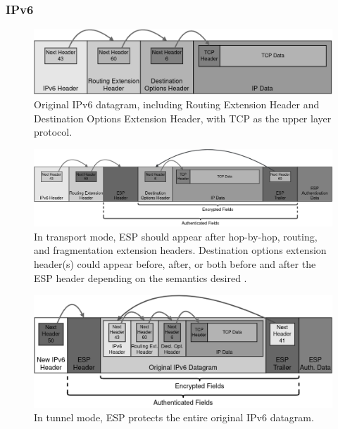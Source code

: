 \documentclass[a4paper,12pt]{report}
\begin{document}
		\subsubsection{IPv6}
		\begin{figure}[!htb]
			\includegraphics[width=\textwidth,height=0.15\textheight,keepaspectratio]{original_ipv6_packet}
			\centering
			\caption{Original IPv6 datagram, including Routing Extension Header and Destination Options Extension Header, with TCP as the upper layer protocol.}
		\end{figure}
		
		\begin{figure}[!htb]
			\includegraphics[width=\textwidth]{esp_ipv6_transport}
			\centering
			\caption{In transport mode, ESP should appear after hop-by-hop, routing, and fragmentation extension headers.  Destination options extension header(s) could appear before, after, or both before and after the ESP header depending on the semantics desired \cite{rfc4303}.}
		\end{figure}
		
		\begin{figure}[!htb]
			\includegraphics[width=\textwidth]{esp_ipv6_tunnel}
			\centering
			\caption{In tunnel mode, ESP protects the entire original IPv6 datagram.}
		\end{figure}
		


\end{document}
